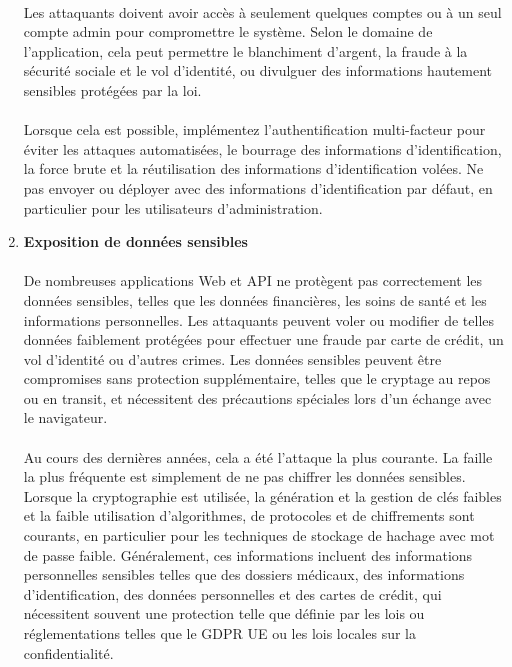 \begin{enumerate}
	\paragraph{}
	Les attaquants doivent avoir accès à seulement quelques comptes ou à un seul compte admin pour compromettre le système. Selon le domaine de l'application, cela peut permettre le blanchiment d'argent, la fraude à la sécurité sociale et le vol d'identité, ou divulguer des informations hautement sensibles protégées par la loi.
	\paragraph{}
	Lorsque cela est possible, implémentez l'authentification multi-facteur pour éviter les attaques automatisées, le bourrage des informations d'identification, la force brute et la réutilisation des informations d'identification volées. Ne pas envoyer ou déployer avec des informations d'identification par défaut, en particulier pour les utilisateurs d'administration.
	
	\vspace*{0.8cm} \item \textbf{Exposition de données sensibles} \vspace*{-0.4cm}
	\paragraph{}
	De nombreuses applications Web et API ne protègent pas correctement les données sensibles, telles que les données financières, les soins de santé et les informations personnelles. Les attaquants peuvent voler ou modifier de telles données faiblement protégées pour effectuer une fraude par carte de crédit, un vol d'identité ou d'autres crimes. Les données sensibles peuvent être compromises sans protection supplémentaire, telles que le cryptage au repos ou en transit, et nécessitent des précautions spéciales lors d'un échange avec le navigateur.
	\paragraph{}
	Au cours des dernières années, cela a été l'attaque la plus courante. La faille la plus fréquente est simplement de ne pas chiffrer les données sensibles. Lorsque la cryptographie est utilisée, la génération et la gestion de clés faibles et la faible utilisation d'algorithmes, de protocoles et de chiffrements sont courants, en particulier pour les techniques de stockage de hachage avec mot de passe faible. 
	Généralement, ces informations incluent des informations personnelles sensibles telles que des dossiers médicaux, des informations d'identification, des données personnelles et des cartes de crédit, qui nécessitent souvent une protection telle que définie par les lois ou réglementations telles que le GDPR UE ou les lois locales sur la confidentialité.

\end{enumerate}
